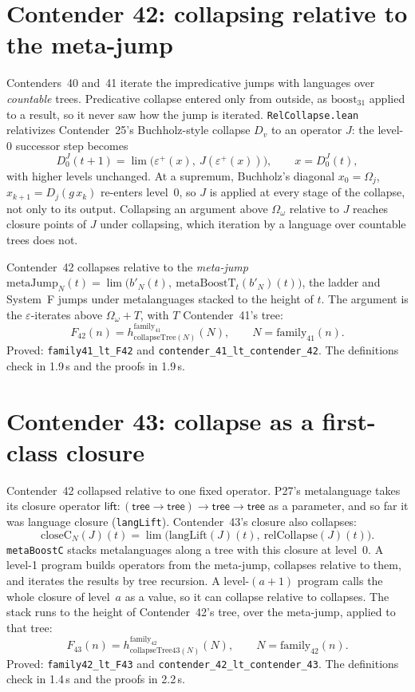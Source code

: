\documentclass[11pt]{article}
\theoremstyle{definition}
\theoremstyle{remark}
\newcommand{\lean}[1]{\texttt{#1}}
\begin{document}
\section{Contender 42: collapsing relative to the meta-jump}

Contenders~40 and~41 iterate the impredicative jumps with languages over
\emph{countable} trees. Predicative collapse entered only from outside, as
$\mathrm{boost}_{31}$ applied to a result, so it never saw how the jump is
iterated. \lean{RelCollapse.lean} relativizes Contender~25's Buchholz-style
collapse $D_v$ to an operator $J$: the level-0 successor step becomes
\[
D^J_0(t+1)=\lim\bigl(\varepsilon^+(x),\ J(\varepsilon^+(x))\bigr),\qquad x=D^J_0(t),
\]
with higher levels unchanged. At a supremum, Buchholz's diagonal
$x_0=\Omega_j$, $x_{k+1}=D_j(g\,x_k)$ re-enters level~0, so $J$ is applied at
every stage of the collapse, not only to its output. Collapsing an argument
above $\Omega_\omega$ relative to $J$ reaches closure points of $J$ under
collapsing, which iteration by a language over countable trees does not.

Contender~42 collapses relative to the \emph{meta-jump}
$\mathrm{metaJump}_N(t)=\lim\bigl(b'_N(t),\ \mathrm{metaBoostT}_t(b'_N)(t)\bigr)$,
the ladder and System~F jumps under metalanguages stacked to the height of
$t$. The argument is the $\varepsilon$-iterates above $\Omega_\omega+T$, with
$T$ Contender~41's tree:
\[
F_{42}(n)=h^{\mathrm{family}_{41}}_{\mathrm{collapseTree}(N)}(N),\qquad N=\mathrm{family}_{41}(n).
\]
Proved: \lean{family41\_lt\_F42} and \lean{contender\_41\_lt\_\allowbreak contender\_42}.
The definitions check in 1.9\,s and the proofs in 1.9\,s.

\section{Contender 43: collapse as a first-class closure}

Contender~42 collapsed relative to one fixed operator. P27's metalanguage takes
its closure operator $\mathsf{lift}:(\mathsf{tree}\to\mathsf{tree})\to\mathsf{tree}\to\mathsf{tree}$
as a parameter, and so far it was language closure (\lean{langLift}).
Contender~43's closure also collapses:
\[
\mathrm{closeC}_N(J)(t)=\lim\bigl(\mathrm{langLift}(J)(t),\ \mathrm{relCollapse}(J)(t)\bigr).
\]
\lean{metaBoostC} stacks metalanguages along a tree with this closure at
level~0. A level-1 program builds operators from the meta-jump, collapses
relative to them, and iterates the results by tree recursion. A level-$(a{+}1)$
program calls the whole closure of level~$a$ as a value, so it can collapse
relative to collapses. The stack runs to the height of Contender~42's tree,
over the meta-jump, applied to that tree:
\[
F_{43}(n)=h^{\mathrm{family}_{42}}_{\mathrm{collapseTree43}(N)}(N),\qquad N=\mathrm{family}_{42}(n).
\]
Proved: \lean{family42\_lt\_F43} and \lean{contender\_42\_lt\_\allowbreak contender\_43}.
The definitions check in 1.4\,s and the proofs in 2.2\,s.
\end{document}
